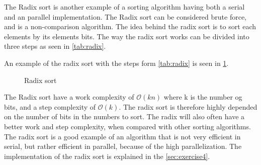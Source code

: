 The Radix sort is another example of a sorting algorithm having both a serial and an parallel implementation. The Radix sort can be considered brute force, and is a non-comparison algorithm. The idea behind the radix sort is to sort each elements by its elements bits. The way the radix sort works can be divided into three steps as seen in \cref{tab:radix}.

\begin{center}
	\label{tab:radix}
\end{center} 

An example of the radix sort with the steps form \cref{tab:radix} is seen in \cref{fig:sort_radix}.

\begin{figure}[ht]
	\centering
	\caption{Radix sort}
	\label{fig:sort_radix}
\end{figure}  

The Radix sort have a work complexity of $\mathcal{O}(kn)$ where k is the number og bits, and a step complexity of $\mathcal{O}(k)$. The radix sort is therefore highly depended on the number of bits in the numbers to sort. The radix will also often have a better work and step complexity, when compared with other sorting algorithms. The radix sort is a good example of an algorithm that is not very efficient in serial, but rather efficient in parallel, because of the high parallelization. The implementation of the radix sort is explained in the \cref{sec:exercise4}.   
